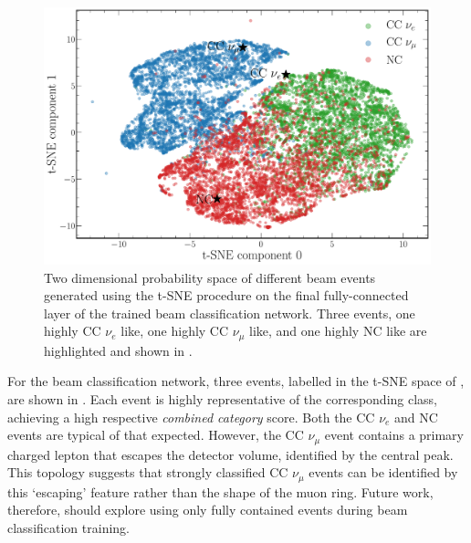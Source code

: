 \begin{figure} %
    \includegraphics[width=\textwidth]{diagrams/7-results/explain_beam_tsne.pdf}
    \caption[Beam classification network output t-SNE space]
    {Two dimensional probability space of different beam events generated using the t-SNE
        procedure on the final fully-connected layer of the trained beam classification network.
        Three events, one highly CC $\nu_{e}$ like, one highly CC $\nu_{\mu}$ like, and one highly
        NC like are highlighted and shown in .}
    \label{fig:explain_beam_tsne}
\end{figure}

For the beam classification network, three events, labelled in the t-SNE space of
, are shown in . Each
event is highly representative of the corresponding class, achieving a high respective
\emph{combined category} score. Both the CC $\nu_{e}$ and NC events are typical of that expected.
However, the CC $\nu_{\mu}$ event contains a primary charged lepton that escapes the detector
volume, identified by the central peak. This topology suggests that strongly classified CC
$\nu_{\mu}$ events can be identified by this `escaping' feature rather than the shape of the muon
ring. Future work, therefore, should explore using only fully contained events during beam
classification training.


